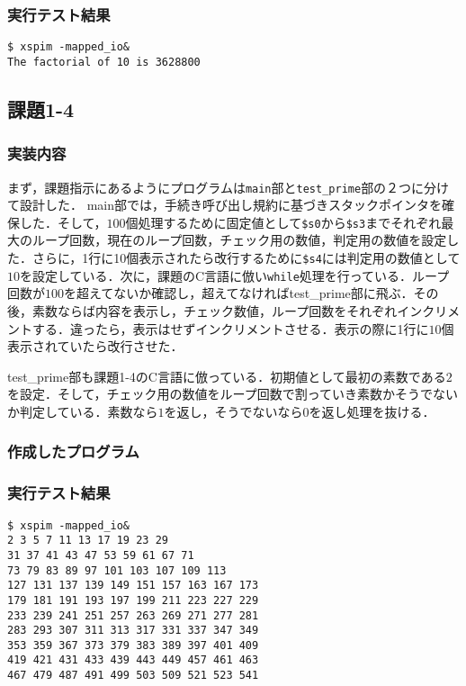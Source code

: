 \documentclass[a4j,11pt]{jarticle}
\begin{document}
  \subsubsection{実行テスト結果}
\begin{verbatim}
$ xspim -mapped_io&
The factorial of 10 is 3628800
\end{verbatim}

 \subsection{課題1-4}
  \subsubsection{実装内容}
  まず，課題指示にあるようにプログラムは\verb|main|部と\verb|test_prime|部の２つに分けて設計した．
  main部では，手続き呼び出し規約に基づきスタックポインタを確保した．そして，$100$個処理するために固定値として\verb|$s0|から\verb|$s3|までそれぞれ最大のループ回数，現在のループ回数，チェック用の数値，判定用の数値を設定した．さらに，1行に10個表示されたら改行するために\verb|$s4|には判定用の数値として$10$を設定している．次に，課題のC言語に倣い\verb|while|処理を行っている．ループ回数が$100$を超えてないか確認し，超えてなければtest\_prime部に飛ぶ．その後，素数ならば内容を表示し，チェック数値，ループ回数をそれぞれインクリメントする．違ったら，表示はせずインクリメントさせる．表示の際に1行に$10$個表示されていたら改行させた．

  test\_prime部も課題1-4のC言語に倣っている．初期値として最初の素数である$2$を設定．そして，チェック用の数値をループ回数で割っていき素数かそうでないか判定している．素数なら$1$を返し，そうでないなら$0$を返し処理を抜ける．
  \subsubsection{作成したプログラム}
   
   \subsubsection{実行テスト結果}
   \begin{verbatim}
$ xspim -mapped_io&
2 3 5 7 11 13 17 19 23 29 
31 37 41 43 47 53 59 61 67 71 
73 79 83 89 97 101 103 107 109 113 
127 131 137 139 149 151 157 163 167 173 
179 181 191 193 197 199 211 223 227 229 
233 239 241 251 257 263 269 271 277 281 
283 293 307 311 313 317 331 337 347 349 
353 359 367 373 379 383 389 397 401 409 
419 421 431 433 439 443 449 457 461 463 
467 479 487 491 499 503 509 521 523 541 
   \end{verbatim}
\end{document}
